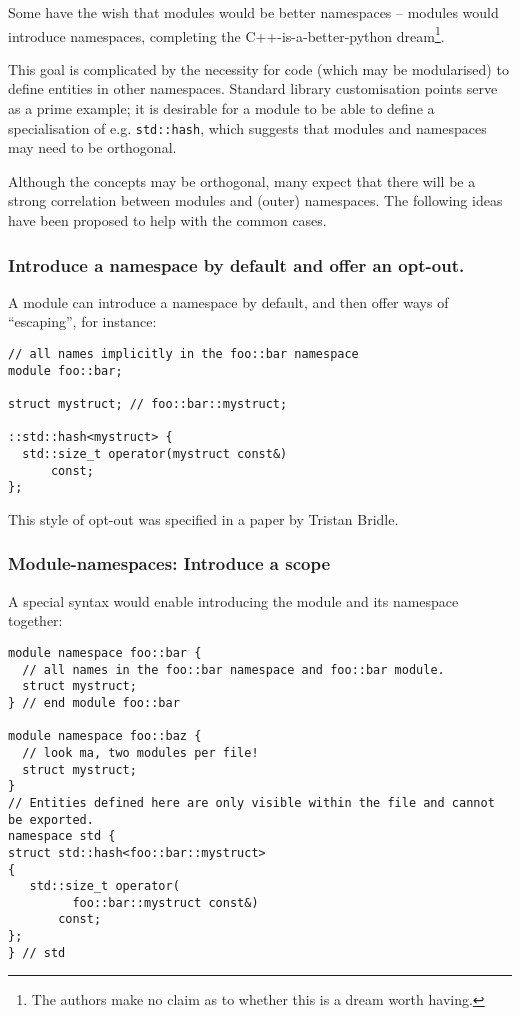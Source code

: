 \documentclass[reqno]{article}
\begin{document}
Some have the wish that modules would be better namespaces -- modules would
introduce namespaces, completing the C++-is-a-better-python dream\footnote{The
authors make no claim as to whether this is a dream worth having.}.

This goal is complicated by the necessity for code (which may be modularised)
to define entities in other namespaces. Standard library customisation points
serve as a prime example; it is desirable for a module to be able to define a
specialisation of e.g. \texttt{std::hash}, which suggests that modules and
namespaces may need to be orthogonal.

Although the concepts may be orthogonal, many expect that there will be a
strong correlation between modules and (outer) namespaces. The following ideas
have been proposed to help with the common cases.


\subsubsection{Introduce a namespace by default and offer an opt-out.}

A module can introduce a namespace by default, and then offer ways of
``escaping'', for instance:

\begin{verbatim}
// all names implicitly in the foo::bar namespace
module foo::bar;

struct mystruct; // foo::bar::mystruct;

::std::hash<mystruct> {
  std::size_t operator(mystruct const&)
      const;
};
\end{verbatim}

This style of opt-out was specified in a paper by Tristan Bridle.~\citep{P0665R0}


\subsubsection{Module-namespaces: Introduce a scope}

A special syntax would enable introducing the module and its namespace together:

\begin{verbatim}
module namespace foo::bar {
  // all names in the foo::bar namespace and foo::bar module.
  struct mystruct;
} // end module foo::bar

module namespace foo::baz {
  // look ma, two modules per file!
  struct mystruct;
}
// Entities defined here are only visible within the file and cannot be exported.
namespace std {
struct std::hash<foo::bar::mystruct>
{
   std::size_t operator(
         foo::bar::mystruct const&)
       const;
};
} // std
\end{verbatim}
\end{document}
